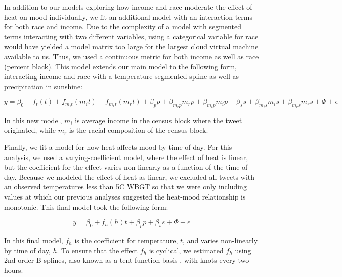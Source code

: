 \documentclass[fleqn,10pt]{wlscirep}
\begin{document}
In addition to our models exploring how income and race moderate the effect of heat on mood individually, we fit an additional model with an interaction terms for both race and income. Due to the complexity of a model with segmented terms interacting with two different variables, using a categorical variable for race would have yielded a model matrix too large for the largest cloud virtual machine available to us. Thus, we used a continuous metric for both income as well as race (percent black). This model extends our main model to the following form, interacting income and race with a temperature segmented spline as well as precipitation in sunshine:

\begin{equation}
 y = \beta_0 + f_t(t) + f_{m_{i}t}(m_{i} t) + f_{m_{r}t}(m_{r} t) +  \beta_p p + \beta_{m_{r} p} m_{r} p + \beta_{m_{i} p} m_{i} p + \beta_s s + \beta_{m_{i} s} m_{i} s +  \beta_{m_{r} s} m_{r} s + 
 \Phi + \epsilon
 \label{mod:race-inc}
\end{equation}

In this new model, $m_{i}$ is average income in the census block where the tweet originated, while $m_{r}$ is the racial composition of the census block.

Finally, we fit a model for how heat affects mood by time of day. For this analysis, we used a varying-coefficient model, where the effect of heat is linear, but the coefficient for the effect varies non-linearly as a function of the time of day. Because we modeled the effect of heat as linear, we excluded all tweets with an observed temperatures less than 5\textdegree C WBGT so that we were only including values at which our previous analyses suggested the heat-mood relationship is monotonic. This final model took the following form:

\begin{equation}
 y = \beta_0 + f_h(h)t + \beta_p p + \beta_s s + \Phi + \epsilon
 \label{mod:tod}
\end{equation}

In this final model, $f_{h}$ is the coefficient for temperature, $t$, and varies non-linearly by time of day, $h$. To ensure that the effect $f_{h}$ is cyclical, we estimated $f_{h}$ using 2nd-order B-splines, also known as a tent function basis \cite[Chapter~4.2]{wood2017generalized}, with knots every two hours.

\end{document}
